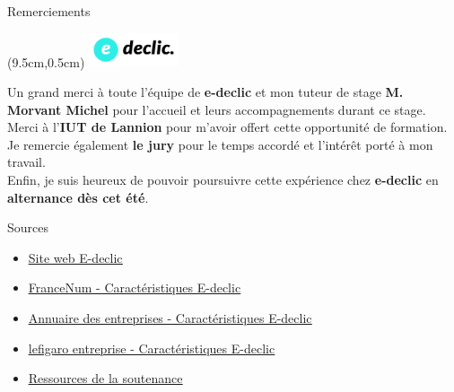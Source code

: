 \documentclass{beamer}
\newcommand{\logoEdeclic}{
	\begin{textblock*}{2cm}(9.5cm,0.5cm)
  		\includegraphics[height=1cm]{../img/logo_e-declic.png}
	\end{textblock*}
}
\begin{document}
\begin{frame}[label=remerciements]{\Large Remerciements}
    \logoEdeclic
    \begin{center}
        \vspace{1em}
        \begin{minipage}{0.9\textwidth}
        		Un grand merci à toute l'équipe de \textbf{e-declic} et mon tuteur de stage \textbf{M. Morvant Michel} pour l'accueil et leurs accompagnements durant ce stage. \vspace{0.25cm} \\
            Merci à l'\textbf{IUT de Lannion} pour m'avoir offert cette opportunité de formation. \vspace{0.25cm} \\
            Je remercie également \textbf{le jury} pour le temps accordé et l'intérêt porté à mon travail. \vspace{0.25cm} \\
            Enfin, je suis heureux de pouvoir poursuivre cette expérience chez \textbf{e-declic} en \textbf{alternance dès cet été}.
        \end{minipage}
    \end{center}
    \vfill
\end{frame}

\begin{frame}[label=sources]{Sources}
	\begin{itemize}
		\item \href{https://www.e-declic.com/}{\underline{Site web E-declic}}
		\item \href{https://www.francenum.gouv.fr/activateurs/e-declic}{\underline{FranceNum - Caractéristiques E-declic}}
		\item \href{https://annuaire-entreprises.data.gouv.fr/entreprise/e-declic-453413296}{\underline{Annuaire des entreprises - Caractéristiques E-declic}}
		\item \href{https://entreprises.lefigaro.fr/e-declic-56/entreprise-453413296}{\underline{lefigaro entreprise - Caractéristiques E-declic}}
		\item \href{https://github.com/Matteo-K/Soutenance_E-delic/tree/main/img}{\underline{Ressources de la soutenance}}
	\end{itemize}
	\vfill
\end{frame}
\end{document}
